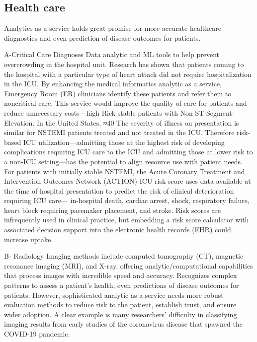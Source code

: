 \subsection{Health care}

\Data Analytics as a service holds great promise for more accurate healthcare diagnostics and even prediction of disease outcomes for patients. 
 
A-Critical Care Diagnoses
Data analytic and ML tools to help prevent overcrowding in the hospital unit. Research has shown that patients coming to the hospital with a particular type of heart attack did not require hospitalization in the ICU. By enhancing the medical informatics analytic as a service, Emergency Room (ER) clinicians identify these patients and refer them to noncritical care. This service would improve the quality of care for patients and reduce unnecessary costs—high Rick stable patients with Non-ST-Segment-Elevation.
In the United States, ≈40%
The severity of illness on presentation is similar for NSTEMI patients treated and not treated in the ICU. Therefore risk-based ICU utilization—admitting those at the highest risk of developing complications requiring ICU care to the ICU and admitting those at lower risk to a non-ICU setting—has the potential to align resource use with patient needs.
For patients with initially stable NSTEMI, the Acute Coronary Treatment and Intervention Outcomes Network (ACTION) ICU risk score uses data available at the time of hospital presentation to predict the risk of clinical deterioration requiring ICU care— in-hospital death, cardiac arrest, shock, respiratory failure, heart block requiring pacemaker placement, and stroke. Risk scores are infrequently used in clinical practice, but embedding a risk score calculator with associated decision support into the electronic 
health records (EHR) could increase uptake. 
 
 B- Radiology
Imaging methods include computed tomography (CT), magnetic resonance imaging (MRI), and X-ray, offering analytic/computational capabilities that process images with incredible speed and accuracy. Recognizes complex patterns to assess a patient's health, even predictions of disease outcomes for patients. However, sophisticated analytic as a service needs more robust evaluation methods to reduce risk to the patient, establish trust, and ensure wider adoption. A clear example is many researchers' difficulty in classifying imaging results from early studies of the coronavirus disease that spawned the COVID-19 pandemic.



